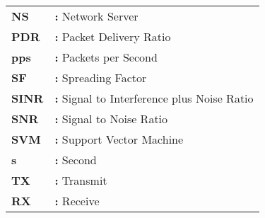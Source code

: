 \begin{tabular}{p{2cm}l}
{\bf NS} & {\bf:} Network Server\\
{\bf PDR} & {\bf:} Packet Delivery Ratio\\
{\bf pps} & {\bf:} Packets per Second\\
{\bf SF} & {\bf:} Spreading Factor\\
{\bf SINR} & {\bf:} Signal to Interference plus Noise Ratio\\
{\bf SNR} & {\bf:} Signal to Noise Ratio\\
{\bf SVM} & {\bf:} Support Vector Machine\\
{\bf s} & {\bf:} Second\\
{\bf TX} & {\bf:} Transmit\\
{\bf RX} & {\bf:} Receive\\
\end{tabular}
